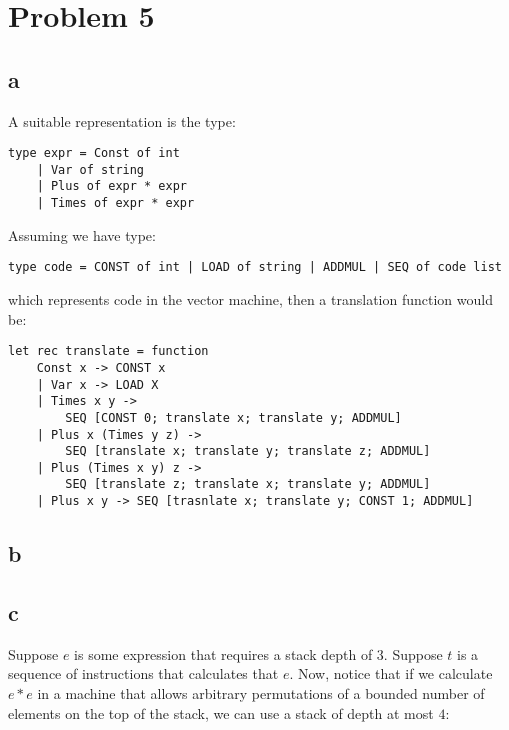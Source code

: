 \section{Problem 5}
\subsection{a}
A suitable representation is the type:
\begin{lstlisting}
type expr = Const of int
    | Var of string
    | Plus of expr * expr
    | Times of expr * expr
\end{lstlisting}
Assuming we have type:
\begin{lstlisting}
type code = CONST of int | LOAD of string | ADDMUL | SEQ of code list
\end{lstlisting}
which represents code in the vector machine, then a translation function would be:

\begin{lstlisting}[language=Ml]
let rec translate = function
    Const x -> CONST x
    | Var x -> LOAD X
    | Times x y ->
        SEQ [CONST 0; translate x; translate y; ADDMUL]
    | Plus x (Times y z) ->
        SEQ [translate x; translate y; translate z; ADDMUL]
    | Plus (Times x y) z ->
        SEQ [translate z; translate x; translate y; ADDMUL]
    | Plus x y -> SEQ [trasnlate x; translate y; CONST 1; ADDMUL]

\end{lstlisting}

\subsection{b}

\subsection{c}
Suppose $e$ is some expression that requires a stack depth of $3$. Suppose $t$ is a sequence of instructions that calculates that $e$. Now, notice that if we calculate $e * e$ in a machine that allows arbitrary permutations of a bounded number of elements on the top of the stack, we can use a stack of depth at most $4$:

